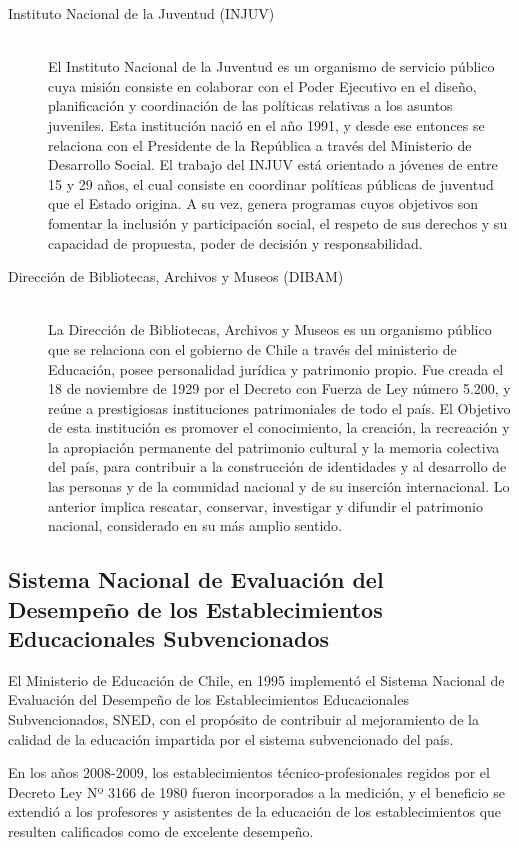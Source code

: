 \begin{description}
\item[Instituto Nacional de la Juventud (INJUV)] \hfill \\
El Instituto Nacional de la Juventud es un organismo de servicio público cuya misión consiste en colaborar con el Poder Ejecutivo en el diseño, planificación y coordinación de las políticas relativas a los asuntos juveniles.
Esta institución nació en el año 1991, y desde ese entonces se relaciona con el Presidente de la República a través del Ministerio de Desarrollo Social.
El trabajo del INJUV está orientado a jóvenes de entre 15 y 29 años, el cual consiste en coordinar políticas públicas de juventud que el Estado origina. A su vez, genera programas cuyos objetivos son fomentar la inclusión y participación social, el respeto de sus derechos y su capacidad de propuesta, poder de decisión y responsabilidad. \cite{injuv} 
\item[Dirección de Bibliotecas, Archivos y Museos (DIBAM)] \hfill \\
La Dirección de Bibliotecas, Archivos y Museos es un organismo público que se relaciona con el gobierno de Chile a través del ministerio de Educación, posee personalidad jurídica y patrimonio propio.
Fue creada el 18 de noviembre de 1929 por el Decreto con Fuerza de Ley número 5.200, y reúne a prestigiosas instituciones patrimoniales de todo el país. 
El Objetivo de esta institución es promover el conocimiento, la creación, la recreación y la apropiación permanente del patrimonio cultural y la memoria colectiva del país, para contribuir a la construcción de identidades y al desarrollo de las personas y de la comunidad nacional y de su inserción internacional. Lo anterior implica rescatar, conservar, investigar y difundir el patrimonio nacional, considerado en su más amplio sentido.\cite{dibam}
\end{description}

\subsection{Sistema Nacional de Evaluación del Desempeño de los Establecimientos Educacionales Subvencionados}

El Ministerio de Educación de Chile, en 1995 implementó el Sistema Nacional de Evaluación del Desempeño de los Establecimientos Educacionales Subvencionados, SNED, con el propósito de contribuir al mejoramiento de la calidad de la educación impartida por el sistema subvencionado del país.

En los años 2008-2009, los establecimientos técnico-profesionales regidos por el Decreto Ley Nº 3166 de 1980 fueron incorporados a la medición, y el beneficio se extendió a los profesores y asistentes de la educación de los establecimientos que resulten calificados como de excelente desempeño.

